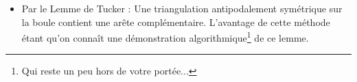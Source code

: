 \documentclass{cours}
\begin{document}
\begin{itemize}
\begin{proof}
              \begin{equation*}
                  \rho(1) = \rho \left(\frac{1}{2} \right) + \frac{c}{2} = \left(\rho(0) + \frac{c}{2} \right) + \frac{c}{2} = c
              \end{equation*}
              Donc $\rho(1)$ est impair, différent de $0$. En particulier, $g_{*}\alpha$ n'est pas homotope à un point, et fait $c$ tours autour du cercle. Ainsi, l'image de $g_{*}$ est différente de l'élément neutre, mais $g_{*}$ est un morphisme du groupe trivial dans un groupe isomorphe à $\mathbb{Z}$, ce qui conclut le raisonnement par l'absurde.
          \end{proof}
    \item Par le Lemme de Tucker\! : Une triangulation antipodalement symétrique sur la boule contient une arête complémentaire. L'avantage de cette méthode étant qu'on connaît une démonstration algorithmique\footnote{Qui reste un peu hors de votre portée...} de ce lemme.
\end{itemize}
\end{document}
